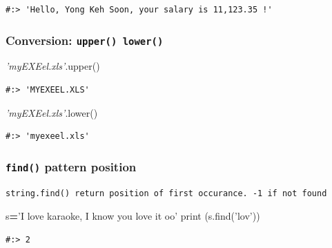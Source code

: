\documentclass[
]{book}
\newenvironment{Shaded}{\begin{snugshade}}{\end{snugshade}}
\newcommand{\BuiltInTok}[1]{#1}
\newcommand{\CommentTok}[1]{\textcolor[rgb]{0.37,0.37,0.37}{\textit{#1}}}
\newcommand{\NormalTok}[1]{#1}
\newcommand{\OperatorTok}[1]{\textcolor[rgb]{0.43,0.43,0.43}{\textbf{#1}}}
\newcommand{\StringTok}[1]{\textcolor[rgb]{0.5,0.5,0.5}{#1}}
\begin{document}
\begin{verbatim}
#:> 'Hello, Yong Keh Soon, your salary is 11,123.35 !'
\end{verbatim}

\hypertarget{conversion-upper-lower}{%
\subsubsection{\texorpdfstring{Conversion: \texttt{upper()\ lower()}}{Conversion: upper() lower()}}\label{conversion-upper-lower}}

\begin{Shaded}
\begin{Highlighting}[]
\CommentTok{'myEXEel.xls'}\NormalTok{.upper()}
\end{Highlighting}
\end{Shaded}

\begin{verbatim}
#:> 'MYEXEEL.XLS'
\end{verbatim}

\begin{Shaded}
\begin{Highlighting}[]
\CommentTok{'myEXEel.xls'}\NormalTok{.lower()}
\end{Highlighting}
\end{Shaded}

\begin{verbatim}
#:> 'myexeel.xls'
\end{verbatim}

\hypertarget{find-pattern-position}{%
\subsubsection{\texorpdfstring{\texttt{find()} pattern position}{find() pattern position}}\label{find-pattern-position}}

\begin{verbatim}
string.find() return position of first occurance. -1 if not found
\end{verbatim}

\begin{Shaded}
\begin{Highlighting}[]
\NormalTok{s}\OperatorTok{=}\StringTok{'I love karaoke, I know you love it oo'}
\BuiltInTok{print}\NormalTok{ (s.find(}\StringTok{'lov'}\NormalTok{))}
\end{Highlighting}
\end{Shaded}

\begin{verbatim}
#:> 2
\end{verbatim}
\end{document}
